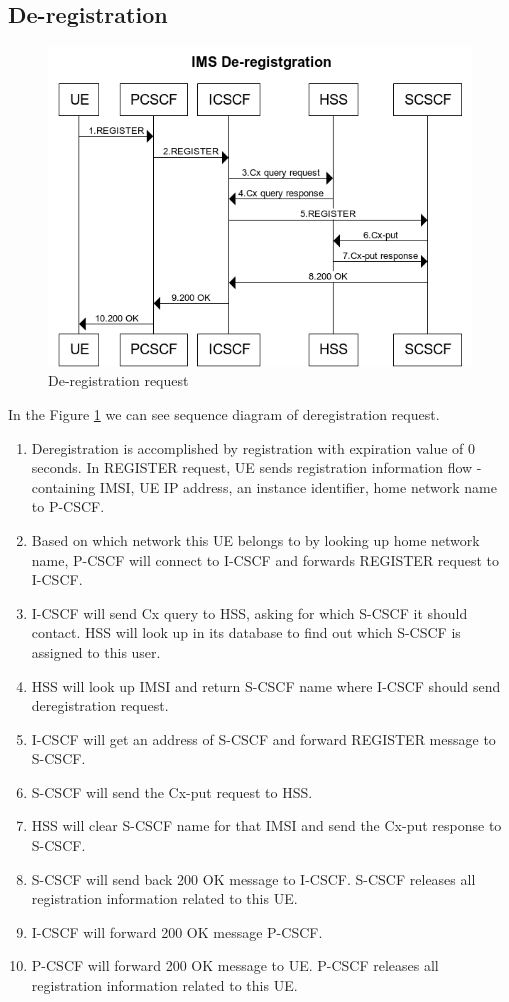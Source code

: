 \documentclass[hidelinks]{report}
\begin{document}
\subsection*{De-registration}
\begin{figure}[!htbp]
\begin{center}
\includegraphics[scale=0.65]{IMS_De-Registration_1.png} 
\caption{De-registration request }
\label{fig4}
\end{center}
\end{figure}
In the Figure \ref{fig4} we can see sequence diagram of deregistration request. 
\begin{enumerate}
\item Deregistration is accomplished by registration with expiration value of 0 seconds. In REGISTER request, UE sends registration information flow - containing IMSI, UE IP address, an instance identifier, home network name to P-CSCF.
\item Based on which network this UE belongs to by looking up home network name, P-CSCF will connect to I-CSCF and forwards REGISTER request to I-CSCF. 
\item I-CSCF will send Cx query to HSS, asking for which S-CSCF it should contact. HSS will look up in its database to find out which S-CSCF is assigned to this user. 
\item HSS will look up IMSI and return S-CSCF name where I-CSCF should send deregistration request.
\item I-CSCF will get an address of S-CSCF and forward REGISTER message to S-CSCF.
\item S-CSCF will send the Cx-put request to HSS. 
\item HSS will clear S-CSCF name for that IMSI and send the Cx-put response to S-CSCF.
\item S-CSCF will send back 200 OK message to I-CSCF. S-CSCF releases all registration information related to this UE.
\item I-CSCF will forward 200 OK message P-CSCF. 
\item P-CSCF will forward 200 OK message to UE. P-CSCF releases all registration information related to this UE.
\end{enumerate}
\end{document}
